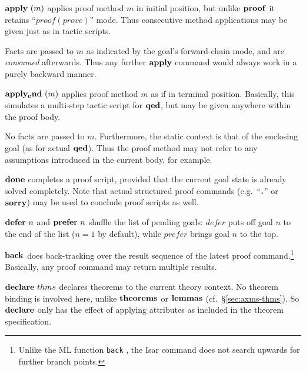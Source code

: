 \begin{descr}
\item [$\APPLY{m}$] applies proof method $m$ in initial position, but unlike
  ${\mathord{\mathbf{proof}}}$ it retains ``$proof(prove)$'' mode.  Thus consecutive method
  applications may be given just as in tactic scripts.
  
  Facts are passed to $m$ as indicated by the goal's forward-chain mode, and
  are \emph{consumed} afterwards.  Thus any further ${\mathord{\mathbf{apply}}}$ command would
  always work in a purely backward manner.
  
\item [${\mathord{\mathbf{apply_end}}}~(m)$] applies proof method $m$ as if in
  terminal position.  Basically, this simulates a multi-step tactic script for
  ${\mathord{\mathbf{qed}}}$, but may be given anywhere within the proof body.
  
  No facts are passed to $m$.  Furthermore, the static context is that of the
  enclosing goal (as for actual ${\mathord{\mathbf{qed}}}$).  Thus the proof method may not
  refer to any assumptions introduced in the current body, for example.

\item [${\mathord{\mathbf{done}}}$] completes a proof script, provided that the
  current goal state is already solved completely.  Note that actual
  structured proof commands (e.g.\ ``$\textbf{.}$'' or ${\mathord{\mathbf{sorry}}}$) may be used to
  conclude proof scripts as well.

\item [${\mathord{\mathbf{defer}}}~n$ and ${\mathord{\mathbf{prefer}}}~n$] shuffle the list
  of pending goals: $defer$ puts off goal $n$ to the end of the list ($n = 1$
  by default), while $prefer$ brings goal $n$ to the top.

\item [${\mathord{\mathbf{back}}}$] does back-tracking over the result sequence of
  the latest proof command.\footnote{Unlike the ML function \texttt{back}
    \cite{isabelle-ref}, the Isar command does not search upwards for further
    branch points.} Basically, any proof command may return multiple results.
  
\item [${\mathord{\mathbf{declare}}}~thms$] declares theorems to the current theory
  context.  No theorem binding is involved here, unlike
  ${\mathord{\mathbf{theorems}}}$ or ${\mathord{\mathbf{lemmas}}}$ (cf.\ 
  \S\ref{sec:axms-thms}).  So ${\mathord{\mathbf{declare}}}$ only has the effect of
  applying attributes as included in the theorem specification.
\end{descr}

